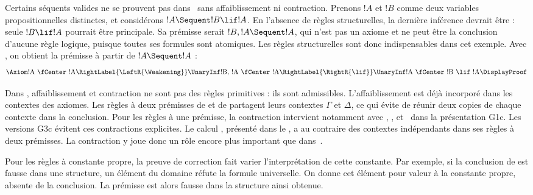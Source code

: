 \documentclass[../../../include/open-logic-section]{subfiles}
\begin{document}
Certains séquents valides ne se prouvent pas
dans~ sans affaiblissement ni contraction.
Prenons $!A$ et $!B$ comme deux variables
propositionnelles distinctes, et considérons
$!A \Sequent !B \lif !A$.
En l'absence de règles structurelles, la dernière
inférence devrait être \RightR{\lif} :
seule $!B \lif !A$ pourrait être principale.
Sa prémisse serait $!B, !A \Sequent !A$,
qui n'est pas un axiome et ne peut être
la conclusion d'aucune règle logique,
puisque toutes ses formules sont atomiques.
Les règles structurelles sont donc indispensables
dans cet exemple. Avec \LeftR{\Weakening},
on obtient la prémisse à partir de
$!A \Sequent !A$ :
\[
\Axiom$!A \fCenter !A$
\RightLabel{\LeftR{\Weakening}}
\UnaryInf$!B, !A \fCenter !A$
\RightLabel{\RightR{\lif}}
\UnaryInf$!A \fCenter !B \lif !A$
\DisplayProof
\]

Dans , affaiblissement et contraction
ne sont pas des règles primitives : ils sont
admissibles. L'affaiblissement est déjà incorporé
dans les contextes des axiomes.
Les règles à deux prémisses de 
et de  partagent leurs contextes
$\Gamma$ et $\Delta$, ce qui évite de réunir
deux copies de chaque contexte dans la conclusion.
Pour les règles à une prémisse, la contraction
intervient notamment avec \RightR{\lor},
\LeftR{\land}, \RightR{\lexists}
et~\LeftR{\lforall} dans la présentation G1c.
Les versions G3c évitent ces contractions explicites.
Le calcul , présenté dans le ,
a au contraire des contextes indépendants
dans ses règles à deux prémisses.
La contraction y joue donc un rôle encore
plus important que dans~.



Pour les règles à constante propre, la preuve de
correction fait varier l'interprétation de cette constante.
Par exemple, si la conclusion de \RightR{\lforall}
est fausse dans une structure, un élément du domaine
réfute la formule universelle. On donne cet élément
pour valeur à la constante propre, absente de la
conclusion. La prémisse est alors fausse dans la
%
%
structure ainsi obtenue.
\end{document}
